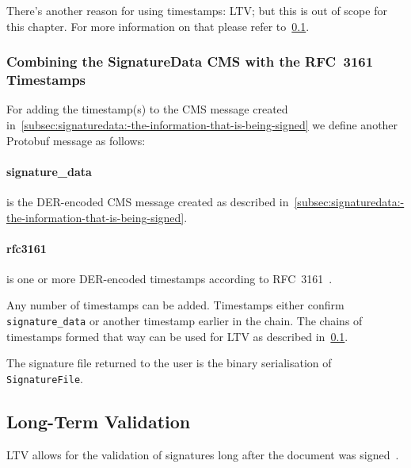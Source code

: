 There's another reason for using timestamps: \glsdesc{LTV}; but this is out of scope for this chapter.
For more information on that please refer to~\ref{subsec:long-term-validation}.

\subsubsection{Combining the SignatureData CMS with the RFC~3161 Timestamps}
For adding the timestamp(s) to the \gls{CMS} message created in~\ref{subsec:signaturedata:-the-information-that-is-being-signed}
we define another Protobuf message as follows:



\paragraph{signature\_data} is the \gls{DER}-encoded \gls{CMS} message created as described in~\ref{subsec:signaturedata:-the-information-that-is-being-signed}.
\paragraph{rfc3161} is one or more \gls{DER}-encoded timestamps according to RFC~3161~\cite{rfc3161}.

Any number of timestamps can be added.
Timestamps either confirm \texttt{signature\_data} or another timestamp earlier in the chain.
The chains of timestamps formed that way can be used for \gls{LTV} as described in~\ref{subsec:long-term-validation}.

The signature file returned to the user is the binary serialisation of \texttt{SignatureFile}.


\subsection{Long-Term Validation}\label{subsec:long-term-validation}
\glsdesc{LTV} allows for the validation of signatures long after the document was signed~\cite{etsipades}.

